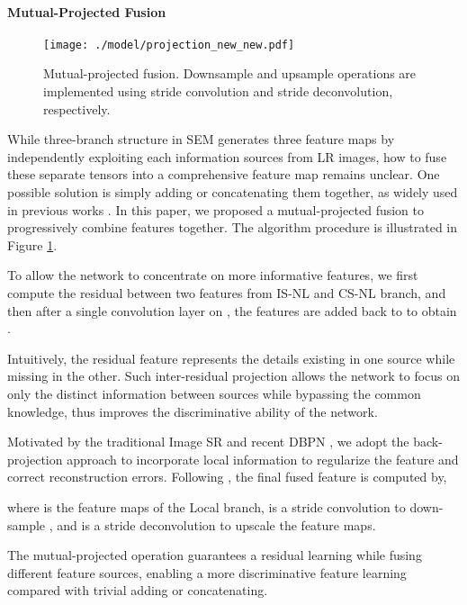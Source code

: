 \documentclass[10pt,twocolumn,letterpaper]{article}
\begin{document}
\paragraph{Mutual-Projected Fusion}
\begin{figure}[t]
	\centering
		\texttt{[image: ./model/projection\_new\_new.pdf]}
	\caption{Mutual-projected fusion. Downsample and upsample operations are implemented using stride convolution and stride deconvolution, respectively.}
	\label{fig:fusion}
\end{figure}
While three-branch structure in SEM generates three feature maps by independently exploiting each information sources from LR images, how to fuse these separate tensors into a comprehensive feature map remains unclear. One possible solution is simply adding or concatenating them together, as widely used in previous works \cite{lim2017enhanced,liu2018non,zhang2019residual,zhang2018residual}. In this paper, we proposed a mutual-projected fusion to progressively combine features together. The algorithm procedure is illustrated in Figure \ref{fig:fusion}.







To allow the network to concentrate on more informative features, we first compute the residual  between two features from IS-NL  and CS-NL  branch, and then after a single convolution layer  on , the features are added back to  to obtain .



Intuitively, the residual feature  represents the details existing in one source while missing in the other. Such inter-residual projection allows the network to focus on only the distinct information between sources while bypassing the common knowledge, thus improves the discriminative ability of the network.





Motivated by the traditional Image SR and recent DBPN \cite{haris2018deep}, we adopt the back-projection approach to incorporate local information to regularize the feature and correct reconstruction errors. Following \cite{haris2018deep}, the final fused feature  is computed by,

where  is the feature maps of the Local branch,  is a stride convolution to down-sample , and  is a stride deconvolution to upscale the feature maps.

The mutual-projected operation guarantees a residual learning while fusing different feature sources, enabling a more discriminative feature learning compared with trivial adding or concatenating. 
\end{document}
